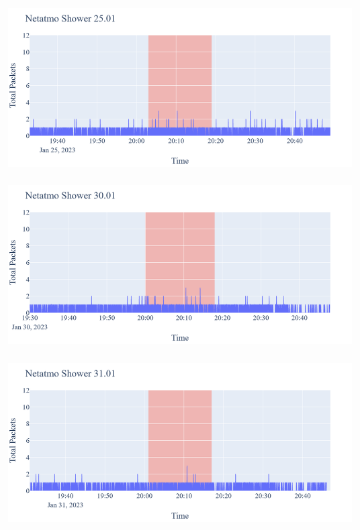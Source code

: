 \begin{figure}[H]
\begin{subfigure}[b]{0.47\textwidth}
        \centering
        \includegraphics[width=1.2\hsize]{figures/Netatmo_Shower_Packets_25.01.png}
    \end{subfigure}
    \begin{subfigure}[b]{0.47\textwidth}
        \centering
        \includegraphics[width=1.2\hsize]{figures/Netatmo_Shower_Packets_30.01.png}
    \end{subfigure}
    \begin{subfigure}[b]{0.47\textwidth}
        \centering
        \includegraphics[width=1.2\hsize]{figures/Netatmo_Shower_Packets_31.01.png}
    \end{subfigure}
    \hspace{0.6cm}
    \begin{subfigure}[b]{0.47\textwidth}

\end{subfigure}
\end{figure}
